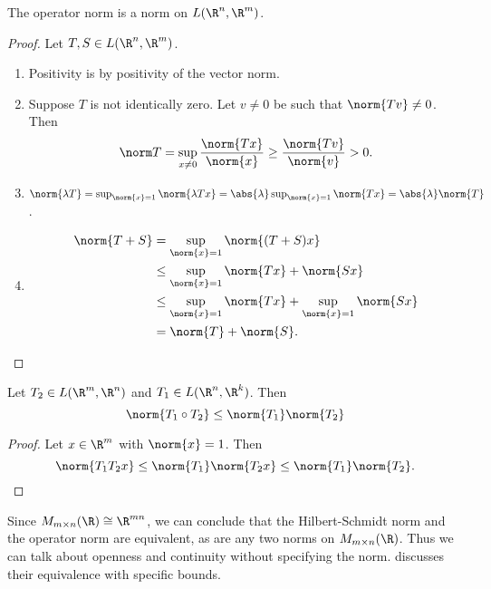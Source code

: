 \begin{proposition}
    The operator norm is a norm on $L(\R^n, \R^m)$.
\end{proposition}
\begin{proof}
    Let $T, S \in L(\R^n, \R^m)$.
    \begin{enumerate}[label=\small(N\arabic*)]
        \item Positivity is by positivity of the vector norm.
        \item Suppose $T$ is not identically zero.
            Let $v \ne 0$ be such that $\norm{Tv} \ne 0$.
            Then \[
                \norm T = \sup_{x \ne 0} \frac{\norm{Tx}}{\norm{x}}
                    \ge \frac{\norm{Tv}}{\norm{v}}
                    > 0.
            \]
        \item $\norm{\lambda T} = \sup_{\norm{x} = 1} \norm{\lambda Tx}
            = \abs{\lambda} \sup_{\norm{x} = 1} \norm{Tx}
            = \abs{\lambda} \norm{T}$.
        \item \begin{align*}
            \norm{T + S} &= \sup_{\norm{x} = 1} \norm{(T + S)x} \\
                &\le \sup_{\norm{x} = 1} \norm{Tx} + \norm{Sx} \\
                &\le \sup_{\norm{x} = 1} \norm{Tx}
                        + \sup_{\norm{x} = 1} \norm{Sx} \\
                &= \norm{T} + \norm{S}. \qedhere
        \end{align*}
    \end{enumerate}
\end{proof}

\begin{proposition}
    Let $T_2 \in L(\R^m, \R^n)$ and $T_1 \in L(\R^n, \R^k)$.
    Then \[
        \norm{T_1 \circ T_2} \le \norm{T_1} \norm{T_2}
    \]
\end{proposition}
\begin{proof}
    Let $x \in \R^m$ with $\norm{x} = 1$.
    Then \[
        \norm{T_1T_2 x} \le \norm{T_1} \norm{T_2 x}
                    \le \norm{T_1} \norm{T_2}. \qedhere
    \]
\end{proof}

Since $M_{m \times n}(\R) \cong \R^{mn}$, we can conclude that
the Hilbert-Schmidt norm and the operator norm are equivalent,
as are any two norms on $M_{m \times n}(\R)$.
Thus we can talk about openness and continuity without specifying
the norm.
 discusses
their equivalence with specific bounds.

